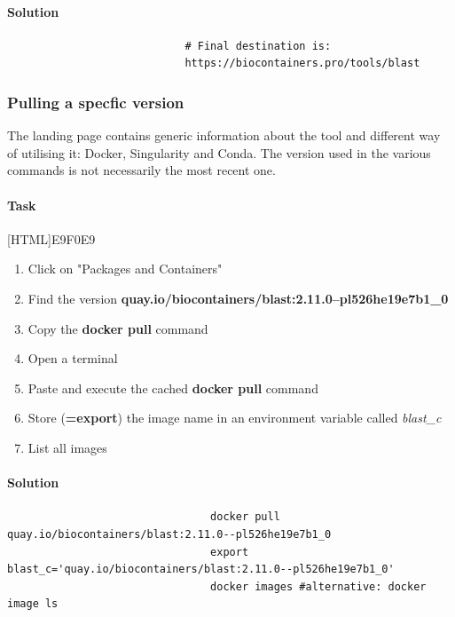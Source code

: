 \documentclass[12pt]{article}
\begin{document}
				\paragraph{Solution}
					\begin{minipage}{\linewidth}
						\begin{lstlisting}
							# Final destination is:
							https://biocontainers.pro/tools/blast
						\end{lstlisting}
					\end{minipage}
		
			\subsubsection{Pulling a specfic version}
				The landing page contains generic information about the tool and different way of utilising it: Docker, Singularity and Conda.
				The version used in the various commands is not necessarily the most recent one.
				
					\paragraph{Task}
						[HTML]{E9F0E9}{\parbox{\linewidth}{%
								\begin{enumerate}
									\item Click on "Packages and Containers"
									\item Find the version \textbf{quay.io/biocontainers/blast:2.11.0--pl526he19e7b1\_0}
									\item Copy the \textbf{docker pull} command
									\item Open a terminal
									\item Paste and execute the cached \textbf{docker pull} command
									\item Store (\textbf{=export}) the image name in an environment variable called \textit{blast\_c}
									\item List all images
								\end{enumerate}
						}}
					
					\paragraph{Solution}	
				
						\begin{minipage}{\linewidth}
							\begin{lstlisting}
								docker pull quay.io/biocontainers/blast:2.11.0--pl526he19e7b1_0
								export blast_c='quay.io/biocontainers/blast:2.11.0--pl526he19e7b1_0'
								docker images #alternative: docker image ls
							\end{lstlisting}
						\end{minipage}
		
\end{document}
